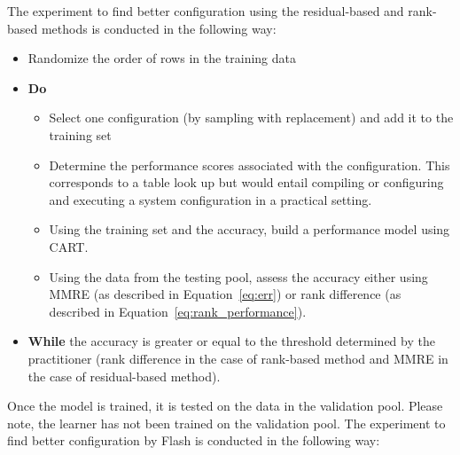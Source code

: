 \documentclass[10pt,journal,compsoc]{IEEEtran}
\newcommand{\flash}{{\sc Flash}\xspace}
\begin{document}
The experiment to find better configuration using the residual-based and rank-based methods is conducted in the following way:
\begin{itemize}[leftmargin=*]
    \item Randomize the order of rows  in  the training data
    \item \textbf{Do}
    \begin{itemize}
        \item Select one configuration (by sampling with replacement) and add it to the training set
        \item Determine the performance scores associated with the configuration. This corresponds to a table look up but would entail compiling or configuring and executing a system configuration in a practical setting.
        \item Using the training set and the accuracy, build a performance model using CART.
        \item Using the data from the testing pool, assess the accuracy either using MMRE (as described in Equation~\ref{eq:err}) or rank difference (as described in Equation~\ref{eq:rank_performance}).         
    \end{itemize}
    \item \textbf{While} the accuracy is greater or equal to the threshold determined by the practitioner (rank difference in the case of rank-based method and MMRE in the case of residual-based method).
\end{itemize}
Once the model is trained, it is tested on the data in the validation pool. Please note, the learner has not been trained on the validation pool.
The experiment to find better configuration by \flash is conducted in the following way:
\end{document}
